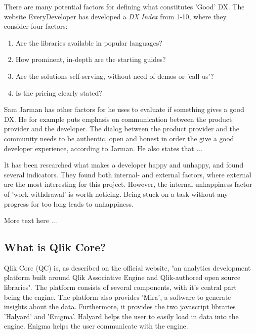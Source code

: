 \documentclass{article}
\begin{document}
There are many potential factors for defining what constitutes 'Good'
DX. The website EveryDeveloper\cite{everydeveloper} has developed a \textit{DX Index} from
1-10, where they consider four factors:

\begin{enumerate}
\item Are the libraries available in popular languages?
\item How prominent, in-depth are the starting guides?
\item Are the solutions self-serving, without need of demos or 'call us'?
\item Is the pricing clearly stated?
\end{enumerate}



Sam Jarman has other factors for he uses to evaluate
if something gives a good DX. He for example puts emphasis on
communication between the product provider and the developer.\cite{jarman} The dialog
between the product provider and the community needs to be authentic,
open and honest in order the give a good developer experience, according
to Jarman. He also states that ...

It has been researched what makes a developer
happy and unhappy\cite{unhappy}, and found several indicators. They found both
internal- and external factors, where external are the most interesting
for this project. However, the internal unhappiness factor of 'work
withdrawal' is worth noticing. Being stuck on a task without any
progress for too long leads to unhappiness.

More text here ...

\subsection{What is Qlik Core?}

Qlik Core (QC) is, as described on the official website, "an analytics
development platform built around Qlik Associative Engine and
Qlik-authored open source libraries".\cite{qlikwebsite} The
platform consists of several components, with it's central part being
the engine. The platform also provides 'Mira', a software to generate
insights about the data. Furthermore, it provides the two javascript
libraries 'Halyard' and 'Enigma'. Halyard helps the user to easily load
in data into the engine. Enigma helps the user communicate with the
engine.
\end{document}

